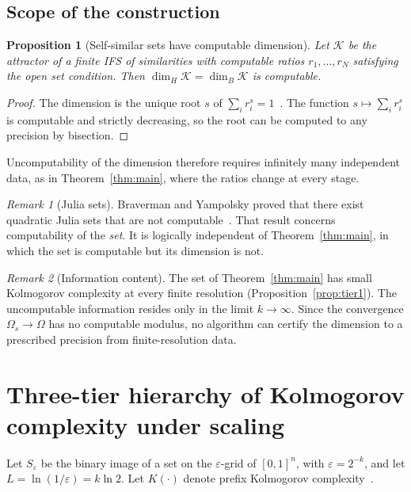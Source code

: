 \documentclass[11pt]{article}
\newtheorem{proposition}{Proposition}[section]
\theoremstyle{definition}\newtheorem{definition}{Definition}[section]
\theoremstyle{remark}\newtheorem*{remark}{Remark}
\newcommand{\Kc}{K}
\begin{document}
\subsection{Scope of the construction}
\begin{proposition}[Self-similar sets have computable dimension]
\label{prop:selfsim}
Let $\mathcal K$ be the attractor of a finite IFS of similarities with computable ratios $r_1,\dots,r_N$ satisfying the
open set condition. Then $\dim_H\mathcal K=\dim_B\mathcal K$ is computable.
\end{proposition}
\begin{proof}
The dimension is the unique root $s$ of $\sum_ir_i^s=1$~\cite{Hutchinson,Falconer}. The function $s\mapsto\sum_ir_i^s$ is
computable and strictly decreasing, so the root can be computed to any precision by bisection.
\end{proof}
Uncomputability of the dimension therefore requires infinitely many independent data, as in
Theorem~\ref{thm:main}, where the ratios change at every stage.

\begin{remark}[Julia sets]
Braverman and Yampolsky proved that there exist quadratic Julia sets that are not computable~\cite{BY}. That
result concerns computability of the \emph{set}. It is logically independent of Theorem~\ref{thm:main}, in which
the set is computable but its dimension is not.
\end{remark}

\begin{remark}[Information content]
The set of Theorem~\ref{thm:main} has small Kolmogorov complexity at every finite resolution
(Proposition~\ref{prop:tier1}). The uncomputable information resides only in the limit $k\to\infty$. Since the
convergence $\Omega_s\to\Omega$ has no computable modulus, no algorithm can certify the dimension to a prescribed
precision from finite-resolution data.
\end{remark}

\section{Three-tier hierarchy of Kolmogorov complexity under scaling}
\label{sec:tiers}

Let $S_\varepsilon$ be the binary image of a set on the $\varepsilon$-grid of $[0,1]^n$, with $\varepsilon=2^{-k}$, and let
$L=\ln(1/\varepsilon)=k\ln2$. Let $\Kc(\cdot)$ denote prefix Kolmogorov complexity~\cite{LiVitanyi}.
\end{document}
